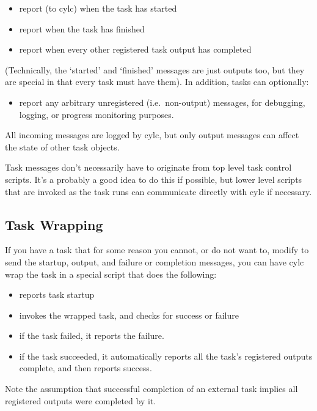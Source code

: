 \documentclass[11pt,a4paper]{article}
\begin{document}
\begin{itemize}
\item report (to cylc) when the task has started
\item report when the task has finished
\item report when every other registered task output has
completed
\end{itemize}

(Technically, the `started' and `finished' messages are just
outputs too, but they are special in that every task
must have them). In addition, tasks can optionally:

\begin{itemize}
\item report any arbitrary unregistered (i.e.\ non-output)
messages, for debugging, logging, or progress monitoring purposes.
\end{itemize}

All incoming messages are logged by cylc, but only output messages can
affect the state of other task objects.

Task messages don't necessarily have to originate from top level task
control scripts. It's a probably a good idea to do this if possible, but
lower level scripts that are invoked as the task runs can communicate
directly with cylc if necessary.

\subsection{Task Wrapping}
\label{TaskWrapping}

If you have a task that for some reason you cannot, or do not want to,
modify to send the startup, output, and failure or completion messages, 
you can have cylc wrap the task in a special script that does the following:

\begin{itemize}
    \item reports task startup
    \item invokes the wrapped task, and checks for success or failure
    \item if the task failed, it reports the failure. 
    \item if the task succeeded, it automatically reports all the task's
        registered outputs complete, and then reports success.
\end{itemize}

Note the assumption that successful completion of an external task
implies all registered outputs were completed by it.
\end{document}
